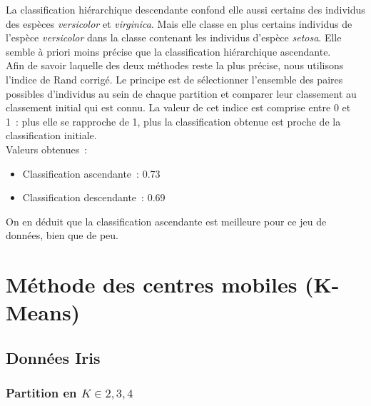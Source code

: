 \documentclass[a4paper,10pt]{report}
\begin{document}
La classification hiérarchique descendante confond elle aussi certains des individus des espèces \textit{versicolor} et \textit{virginica}. Mais elle classe en plus certains individus de l'espèce \textit{versicolor} dans la classe contenant les individus d'espèce \textit{setosa}. Elle semble à priori moins précise que la classification hiérarchique ascendante.\\

Afin de savoir laquelle des deux méthodes reste la plus précise, nous utilisons l'indice de Rand corrigé. Le principe est de sélectionner l'ensemble des paires possibles d'individus au sein de chaque partition et comparer leur classement au classement initial qui est connu. La valeur de cet indice est comprise entre 0 et 1~: plus elle se rapproche de 1, plus la classification obtenue est proche de la classification initiale.\\

Valeurs obtenues~:
\begin{itemize}
	\item Classification ascendante~: 0.73
	\item Classification descendante~: 0.69
\end{itemize}

On en déduit que la classification ascendante est meilleure pour ce jeu de données, bien que de peu.




\chapter{Méthode des centres mobiles (K-Means)}



\section{Données Iris}


\subsection{Partition en $K \in {2,3,4}$}
\end{document}
